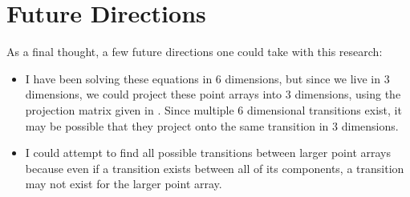 \documentclass[a4paper,10pt]{article}
\theoremstyle{plain}
\theoremstyle{definition}
\theoremstyle{remark}
\begin{document}
\section{Future Directions}
As a final thought, a few future directions one could take with this research:
\begin{itemize}
    \item I have been solving these equations in 6 dimensions, but since we live in 3 dimensions, we could project these point arrays into 3 dimensions, using the projection matrix given in \cite{indelicatoetal2012}.
    Since multiple 6 dimensional transitions exist, it may be possible that they project onto the same transition in 3 dimensions.
    \item I could attempt to find all possible transitions between larger point arrays because even if a transition exists between all of its components, a transition may not exist for the larger point array.
\end{itemize}

%
\medskip

\end{document}
